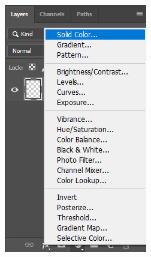 \documentclass{beamer}
\begin{document}
\begin{frame}
\begin{columns}
\begin{center}
			\includegraphics[width = 1.0\textwidth]{images/fill2.png}
	\end{center}
\end{columns}
\end{frame}
\end{document}
